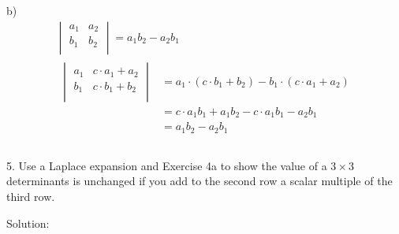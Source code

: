 \documentclass{article}
\begin{document}
b)
\begin{gather*}
  \begin{vmatrix}
    a_1 & a_2 \\
    b_1 & b_2 \\
  \end{vmatrix} = a_1b_2 - a_2b_1 \\
  \begin{split}
    \begin{vmatrix}
      a_1 & c \cdot a_1 + a_2 \\
      b_1 & c \cdot b_1 + b_2 \\
    \end{vmatrix} &= 
    a_1 \cdot (c \cdot b_1 + b_2) - b_1 \cdot (c \cdot a_1 + a_2) \\
    &= c \cdot a_1b_1 + a_1b_2 - c \cdot a_1b_1 - a_2b_1\\
    &= a_1b_2 - a_2b_1 \\
  \end{split} \\
\end{gather*}

5. Use a Laplace expansion and Exercise 4a to show the value of a $3 \times 3$
determinants is unchanged if you add to the second row a scalar multiple of the
third row.

Solution:
\end{document}

